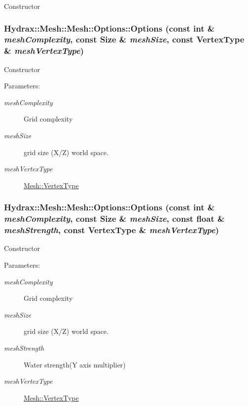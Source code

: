 Constructor \hypertarget{struct_hydrax_1_1_mesh_1_1_options_d47ad4179acb237742edc21250e85841}{
\subsubsection[{Options}]{\setlength{\rightskip}{0pt plus 5cm}Hydrax::Mesh::Mesh::Options::Options (const int \& {\em meshComplexity}, \/  const {\bf Size} \& {\em meshSize}, \/  const {\bf VertexType} \& {\em meshVertexType})}}
\label{struct_hydrax_1_1_mesh_1_1_options_d47ad4179acb237742edc21250e85841}


Constructor \begin{Desc}
\item[Parameters:]
\begin{description}
\item[{\em meshComplexity}]Grid complexity \item[{\em meshSize}]grid size (X/Z) world space. \item[{\em meshVertexType}]\hyperlink{class_hydrax_1_1_mesh_5409dc682ec836d1922dc193fc1bf559}{Mesh::VertexType} \end{description}
\end{Desc}
\hypertarget{struct_hydrax_1_1_mesh_1_1_options_803afc2a1b366b8cdea3a400201aa78e}{
\subsubsection[{Options}]{\setlength{\rightskip}{0pt plus 5cm}Hydrax::Mesh::Mesh::Options::Options (const int \& {\em meshComplexity}, \/  const {\bf Size} \& {\em meshSize}, \/  const float \& {\em meshStrength}, \/  const {\bf VertexType} \& {\em meshVertexType})}}
\label{struct_hydrax_1_1_mesh_1_1_options_803afc2a1b366b8cdea3a400201aa78e}


Constructor \begin{Desc}
\item[Parameters:]
\begin{description}
\item[{\em meshComplexity}]Grid complexity \item[{\em meshSize}]grid size (X/Z) world space. \item[{\em meshStrength}]Water strength(Y axis multiplier) \item[{\em meshVertexType}]\hyperlink{class_hydrax_1_1_mesh_5409dc682ec836d1922dc193fc1bf559}{Mesh::VertexType} \end{description}
\end{Desc}


